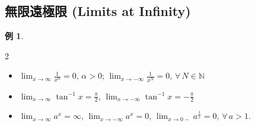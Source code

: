 \documentclass[12pt]{extarticle}
\newcommand{\ds}{\displaystyle}
\newcommand{\floor}[1]{\lfloor #1 \rfloor}
\theoremstyle{definition}
\newtheorem*{ex}{例}
\newtheorem*{sol}{解}
\begin{document}
%

\subsection*{無限遠極限 (Limits at Infinity) }
\begin{ex}
  \begin{multicols}{2}
    \begin{itemize}\setlength\itemsep{0em}
      \item $\ds\lim_{x\to\infty}\frac{1}{x^\alpha} = 0$, $\alpha > 0$; $\ds\lim_{x\to-\infty}\frac{1}{x^N} = 0$, $\forall\,N\in\mathbb{N}$
      \item $\ds\lim_{x\to\infty}\tan^{-1} x = \frac{\pi}{2}$, $\ds\lim_{x\to-\infty}\tan^{-1} x = -\frac{\pi}{2}$
      \item $\ds\lim_{x\to\infty}a^x = \infty$, $\ds\lim_{x\to-\infty}a^x = 0$, $\ds\lim_{x\to0-}a^{\frac{1}{x}} = 0$, $\forall\,a > 1$. 
    \end{itemize}
  \end{multicols}
\end{ex}
\end{document}
